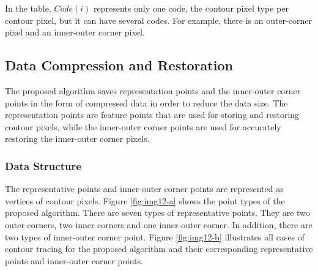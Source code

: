 \documentclass[sensors,article,accept,moreauthors,pdftex,10pt,a4paper]{mdpi}
\begin{document}

In the table, $Code (i)$ represents only one code, the contour pixel type per contour pixel, but it can have several codes. For example, there is an outer-corner pixel and an inner-outer corner pixel. 


 \subsection{Data Compression and Restoration}


 The proposed algorithm saves representation points and the inner-outer corner points in the form of compressed data in order to reduce the data size. The representation points are feature points that are used for storing and restoring contour pixels, while the inner-outer corner points are used for accurately restoring the inner-outer corner pixels. 


\newpage
 \subsubsection{Data Structure}

The representative points and inner-outer corner points are represented as vertices of contour pixels. Figure \ref{fig:img12-a} shows the point types of the proposed algorithm. There are seven types of representative points. They are two outer corners, two inner corners and one inner-outer corner. In addition, there are two types of inner-outer corner point. Figure \ref{fig:img12-b} illustrates all cases of contour tracing for the proposed algorithm and their corresponding representative points and inner-outer corner points. 
\end{document}
